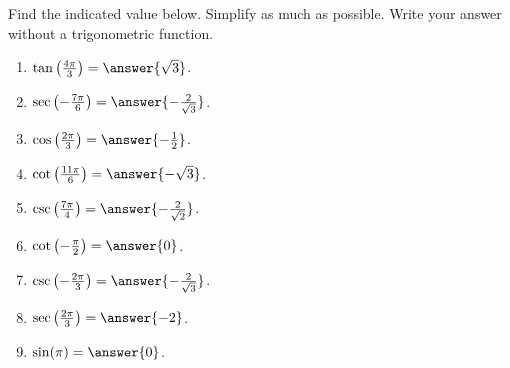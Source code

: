 \documentclass{ximera}
\author{Kenneth Berglund}
\begin{document}
\begin{exercise}
Find the indicated value below. Simplify as much as possible. Write your answer without a trigonometric function.

\begin{enumerate}
\item $\tan\left(\frac{4\pi}{3}\right) = \answer{\sqrt{3}}$.

\item $\sec\left(-\frac{7\pi}{6}\right) = \answer{-\frac{2}{\sqrt{3}}}$.

\item $\cos\left(\frac{2\pi}{3}\right) = \answer{-\frac{1}{2}}$.

\item $\cot\left(\frac{11\pi}{6}\right) = \answer{-\sqrt{3}}$.

\item $\csc\left(\frac{7\pi}{4}\right) = \answer{-\frac{2}{\sqrt{2}}}$.

\item $\cot\left(-\frac{\pi}{2}\right) = \answer{0}$.

\item $\csc\left(-\frac{2\pi}{3}\right) = \answer{-\frac{2}{\sqrt{3}}}$.

\item $\sec\left(\frac{2\pi}{3}\right) = \answer{-2}$.

\item $\sin(\pi) = \answer{0}$.
\end{enumerate}

\end{exercise}
\end{document}
